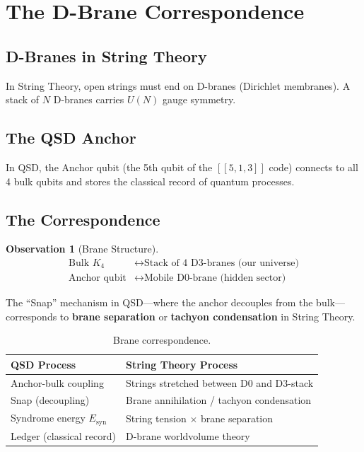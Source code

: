 \documentclass[11pt,a4paper]{article}
\theoremstyle{definition}
\newtheorem{observation}[theorem]{Observation}
\begin{document}
\section{The D-Brane Correspondence}
\label{sec:branes}

\subsection{D-Branes in String Theory}

In String Theory, open strings must end on D-branes (Dirichlet membranes). A stack of $N$ D-branes carries $U(N)$ gauge symmetry.

\subsection{The QSD Anchor}

In QSD, the Anchor qubit (the 5th qubit of the $[[5,1,3]]$ code) connects to all 4 bulk qubits and stores the classical record of quantum processes.

\subsection{The Correspondence}

\begin{observation}[Brane Structure]
\begin{align}
\text{Bulk } K_4 &\longleftrightarrow \text{Stack of 4 D3-branes (our universe)} \\
\text{Anchor qubit} &\longleftrightarrow \text{Mobile D0-brane (hidden sector)}
\end{align}
\end{observation}

The ``Snap'' mechanism in QSD---where the anchor decouples from the bulk---corresponds to \textbf{brane separation} or \textbf{tachyon condensation} in String Theory.

\begin{table}[h]
\centering
\begin{tabular}{ll}
\toprule
\textbf{QSD Process} & \textbf{String Theory Process} \\
\midrule
Anchor-bulk coupling & Strings stretched between D0 and D3-stack \\
Snap (decoupling) & Brane annihilation / tachyon condensation \\
Syndrome energy $E_{\text{syn}}$ & String tension $\times$ brane separation \\
Ledger (classical record) & D-brane worldvolume theory \\
\bottomrule
\end{tabular}
\caption{Brane correspondence.}
\end{table}
\end{document}

